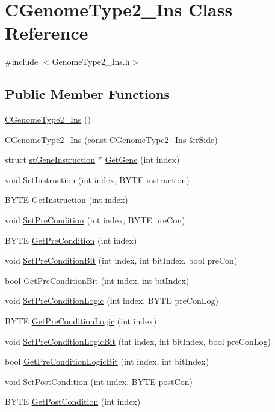\hypertarget{classCGenomeType2__Ins}{
\section{CGenomeType2\_\-Ins Class Reference}
\label{classCGenomeType2__Ins}
}


{\ttfamily \#include $<$GenomeType2\_\-Ins.h$>$}\subsection*{Public Member Functions}
\begin{DoxyCompactItemize}
\item 
\hyperlink{classCGenomeType2__Ins_a048014721936129050d2f72c0b2ec950}{CGenomeType2\_\-Ins} ()
\item 
\hyperlink{classCGenomeType2__Ins_a0b7e8f1ad3282bfda4223de5b2cdc7d2}{CGenomeType2\_\-Ins} (const \hyperlink{classCGenomeType2__Ins}{CGenomeType2\_\-Ins} \&rSide)
\item 
struct \hyperlink{structstGeneInstruction}{stGeneInstruction} $\ast$ \hyperlink{classCGenomeType2__Ins_a07d84d4a76655fd529fabb16037d4304}{GetGene} (int index)
\item 
void \hyperlink{classCGenomeType2__Ins_a179553e578b127985d5526360616ac0c}{SetInstruction} (int index, BYTE instruction)
\item 
BYTE \hyperlink{classCGenomeType2__Ins_ab61bdf996674a2d443cc4a14d4b19f47}{GetInstruction} (int index)
\item 
void \hyperlink{classCGenomeType2__Ins_af983154bb5cb502effe57484e4d0cdd9}{SetPreCondition} (int index, BYTE preCon)
\item 
BYTE \hyperlink{classCGenomeType2__Ins_a9403187ee6f9a6095341f843e30d545d}{GetPreCondition} (int index)
\item 
void \hyperlink{classCGenomeType2__Ins_a109dc11d7cbfa8fd630729bdcbe35e58}{SetPreConditionBit} (int index, int bitIndex, bool preCon)
\item 
bool \hyperlink{classCGenomeType2__Ins_a9d93b1f193e5e7024e66a7ed396b1494}{GetPreConditionBit} (int index, int bitIndex)
\item 
void \hyperlink{classCGenomeType2__Ins_ac474201ad2ab18e57cba38950504518d}{SetPreConditionLogic} (int index, BYTE preConLog)
\item 
BYTE \hyperlink{classCGenomeType2__Ins_aed5cc6df352196cfaa6832a6992f2757}{GetPreConditionLogic} (int index)
\item 
void \hyperlink{classCGenomeType2__Ins_a397c59c680ddccdbec3b0fd8f6627f3d}{SetPreConditionLogicBit} (int index, int bitIndex, bool preConLog)
\item 
bool \hyperlink{classCGenomeType2__Ins_a27038563ce483ebfd7a7a0dd1b19e761}{GetPreConditionLogicBit} (int index, int bitIndex)
\item 
void \hyperlink{classCGenomeType2__Ins_a073bf5cc9b04d06d92d9a80c300c1238}{SetPostCondition} (int index, BYTE postCon)
\item 
BYTE \hyperlink{classCGenomeType2__Ins_acf4f290bc5866b175232d467664260ef}{GetPostCondition} (int index)
\end{DoxyCompactItemize}
